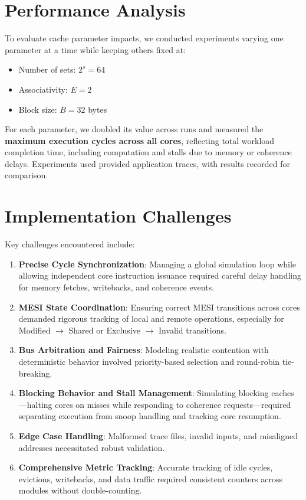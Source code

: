 \documentclass[11pt]{article}
\begin{document}
\section{Performance Analysis}

To evaluate cache parameter impacts, we conducted experiments varying one parameter at a time while keeping others fixed at:
\begin{itemize}
    \item Number of sets: $2^s = 64$
    \item Associativity: $E = 2$
    \item Block size: $B = 32$ bytes
\end{itemize}

For each parameter, we doubled its value across runs and measured the \textbf{maximum execution cycles across all cores}, reflecting total workload completion time, including computation and stalls due to memory or coherence delays. Experiments used provided application traces, with results recorded for comparison.

\section{Implementation Challenges}

Key challenges encountered include:
\begin{enumerate}
    \item \textbf{Precise Cycle Synchronization}: Managing a global simulation loop while allowing independent core instruction issuance required careful delay handling for memory fetches, writebacks, and coherence events.
    \item \textbf{MESI State Coordination}: Ensuring correct MESI transitions across cores demanded rigorous tracking of local and remote operations, especially for Modified $\to$ Shared or Exclusive $\to$ Invalid transitions.
    \item \textbf{Bus Arbitration and Fairness}: Modeling realistic contention with deterministic behavior involved priority-based selection and round-robin tie-breaking.
    \item \textbf{Blocking Behavior and Stall Management}: Simulating blocking caches—halting cores on misses while responding to coherence requests—required separating execution from snoop handling and tracking core resumption.
    \item \textbf{Edge Case Handling}: Malformed trace files, invalid inputs, and misaligned addresses necessitated robust validation.
    \item \textbf{Comprehensive Metric Tracking}: Accurate tracking of idle cycles, evictions, writebacks, and data traffic required consistent counters across modules without double-counting.
\end{enumerate}
\end{document}
